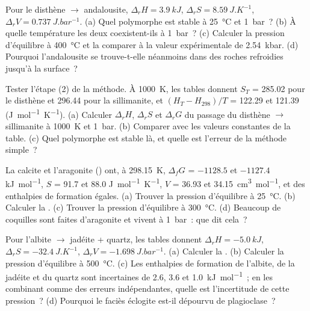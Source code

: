 \begin{exercise}[$\star\star$]\label{exo:b2:metamorphic-facies:5}
Pour le disthène $\to$ andalousite, $\Delta_r H = \qty{3.9}{kJ}$, $\Delta_r S =
\qty{8.59}{J.K^{-1}}$, $\Delta_r V = \qty{0.737}{J.bar^{-1}}$. (a) Quel polymorphe est
stable à \qty{25}{\celsius} et \qty{1}{bar}~? (b) À quelle température les deux
coexistent-ils à \qty{1}{bar}~? (c) Calculer la pression d'équilibre à \qty{400}{\celsius} et
la comparer à la valeur expérimentale de \qty{2.54}{kbar}. (d) Pourquoi l'andalousite se trouve-t-elle
néanmoins dans des roches refroidies jusqu'à la surface~?
\end{exercise}

\begin{exercise}[$\star\star$]\label{exo:b2:metamorphic-facies:6}
Tester l'étape (2) de la méthode. À \qty{1000}{K}, les tables donnent $S_T$ = 285.02 pour le disthène
et 296.44 pour la sillimanite, et $(H_T - H_{298})/T$ = 122.29 et 121.39
(\unit{J.mol^{-1}.K^{-1}}). (a) Calculer $\Delta_r H$, $\Delta_r S$ et $\Delta_r G$ du
passage du disthène $\to$ sillimanite à \qty{1000}{K} et \qty{1}{bar}. (b) Comparer avec les valeurs
constantes de la table. (c) Quel polymorphe est stable là, et quelle est l'erreur de
la méthode simple~?
\end{exercise}

\begin{exercise}[$\star\star$]\label{exo:b2:metamorphic-facies:7}
La calcite et l'aragonite () ont, à \qty{298.15}{K}, $\Delta_f G$ = $-1128.5$ et
$-1127.4$ \unit{kJ.mol^{-1}}, $S$ = 91.7 et 88.0 \unit{J.mol^{-1}.K^{-1}}, $V$ = 36.93
et \qty{34.15}{cm^3.mol^{-1}}, et des enthalpies de formation égales. (a) Trouver la
pression d'équilibre à \qty{25}{\celsius}. (b) Calculer la . (c) Trouver la
pression d'équilibre à \qty{300}{\celsius}. (d) Beaucoup de coquilles sont faites d'aragonite et
vivent à \qty{1}{bar}~: que dit cela~?
\end{exercise}

\begin{exercise}[$\star\star$]\label{exo:b2:metamorphic-facies:8}
Pour l'albite $\to$ jadéite + quartz, les tables donnent $\Delta_r H = \qty{-5.0}{kJ}$,
$\Delta_r S = \qty{-32.4}{J.K^{-1}}$, $\Delta_r V = \qty{-1.698}{J.bar^{-1}}$. (a)
Calculer la . (b) Calculer la pression d'équilibre à \qty{500}{\celsius}.
(c) Les enthalpies de formation de l'albite, de la jadéite et du quartz sont incertaines de 2.6, 3.6
et \qty{1.0}{kJ.mol^{-1}}~; en les combinant comme des erreurs indépendantes, quelle est l'incertitude de cette
pression~? (d) Pourquoi le faciès éclogite est-il dépourvu de plagioclase~?
\end{exercise}

